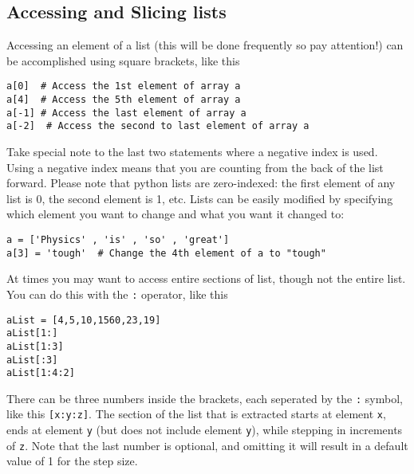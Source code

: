 \subsection*{Accessing and Slicing lists}
Accessing an element of a list (this will be done frequently so pay
attention!) can be accomplished using square brackets, like this
\begin{Verbatim}
a[0]  # Access the 1st element of array a
a[4]  # Access the 5th element of array a
a[-1] # Access the last element of array a
a[-2]  # Access the second to last element of array a
\end{Verbatim}
Take special note to the last two statements where a negative index is
used.  Using a negative index means that you are counting from the
back of the list forward.
Please note that python lists are zero-indexed: the first element of
any list is 0, the second element is 1, etc.  Lists can be easily
modified by specifying which element you want to change and what you
want it changed to:
\begin{Verbatim}
a = ['Physics' , 'is' , 'so' , 'great']
a[3] = 'tough'  # Change the 4th element of a to "tough"
\end{Verbatim}
At times you may want to access entire sections of list, though not
the entire list.  You can do this with the \texttt{:} operator, like
this
\begin{Verbatim}
aList = [4,5,10,1560,23,19]
aList[1:]  
aList[1:3] 
aList[:3]  
aList[1:4:2]
\end{Verbatim}
There can be three numbers inside the brackets, each seperated by the
\texttt{:} symbol, like this \texttt{[x:y:z]}.  The section of the
list that is extracted starts at element \texttt{x}, ends at element
\texttt{y} (but does not include element \texttt{y}), while stepping in
increments of \texttt{z}.  Note that the last number is optional, and
omitting it will result in a default value of 1 for the step size.
